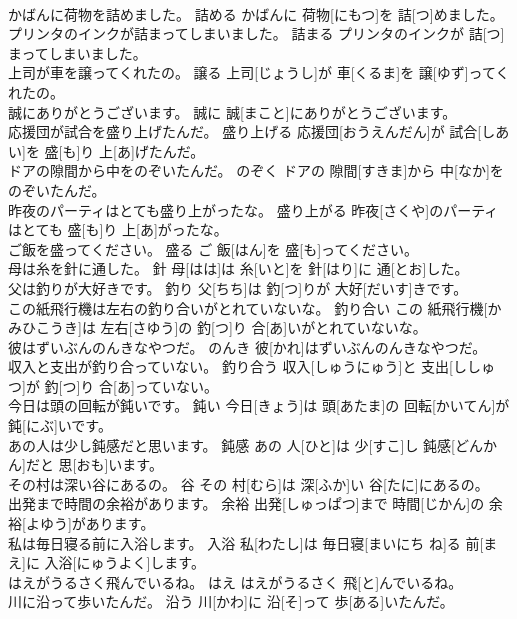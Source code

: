 \documentclass[8pt]{extreport}
\begin{document}
\begin{CJK}{UTF8}{min}
\\	かばんに荷物を詰めました。	詰める	かばんに 荷物[にもつ]を 詰[つ]めました。	
\\	プリンタのインクが詰まってしまいました。	詰まる	プリンタのインクが 詰[つ]まってしまいました。	
\\	上司が車を譲ってくれたの。	譲る	上司[じょうし]が 車[くるま]を 譲[ゆず]ってくれたの。	
\\	誠にありがとうございます。	誠に	誠[まこと]にありがとうございます。	
\\	応援団が試合を盛り上げたんだ。	盛り上げる	応援団[おうえんだん]が 試合[しあい]を 盛[も]り 上[あ]げたんだ。	
\\	ドアの隙間から中をのぞいたんだ。	のぞく	ドアの 隙間[すきま]から 中[なか]をのぞいたんだ。	
\\	昨夜のパーティはとても盛り上がったな。	盛り上がる	昨夜[さくや]のパーティはとても 盛[も]り 上[あ]がったな。	
\\	ご飯を盛ってください。	盛る	ご 飯[はん]を 盛[も]ってください。	
\\	母は糸を針に通した。	針	母[はは]は 糸[いと]を 針[はり]に 通[とお]した。	
\\	父は釣りが大好きです。	釣り	父[ちち]は 釣[つ]りが 大好[だいす]きです。	
\\	この紙飛行機は左右の釣り合いがとれていないな。	釣り合い	この 紙飛行機[かみひこうき]は 左右[さゆう]の 釣[つ]り 合[あ]いがとれていないな。	
\\	彼はずいぶんのんきなやつだ。	のんき	彼[かれ]はずいぶんのんきなやつだ。	
\\	収入と支出が釣り合っていない。	釣り合う	収入[しゅうにゅう]と 支出[ししゅつ]が 釣[つ]り 合[あ]っていない。	
\\	今日は頭の回転が鈍いです。	鈍い	今日[きょう]は 頭[あたま]の 回転[かいてん]が 鈍[にぶ]いです。	
\\	あの人は少し鈍感だと思います。	鈍感	あの 人[ひと]は 少[すこ]し 鈍感[どんかん]だと 思[おも]います。	
\\	その村は深い谷にあるの。	谷	その 村[むら]は 深[ふか]い 谷[たに]にあるの。	
\\	出発まで時間の余裕があります。	余裕	出発[しゅっぱつ]まで 時間[じかん]の 余裕[よゆう]があります。	
\\	私は毎日寝る前に入浴します。	入浴	私[わたし]は 毎日寝[まいにち ね]る 前[まえ]に 入浴[にゅうよく]します。	
\\	はえがうるさく飛んでいるね。	はえ	はえがうるさく 飛[と]んでいるね。	
\\	川に沿って歩いたんだ。	沿う	川[かわ]に 沿[そ]って 歩[ある]いたんだ。	

\end{CJK}
\end{document}
